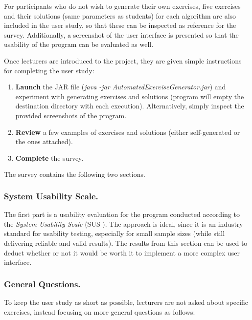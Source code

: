 \documentclass{l4proj}
\begin{document}
For participants who do not wish to generate their own exercises, five exercises and their solutions (same parameters as students) for each algorithm are also included in the user study, so that these can be inspected as reference for the survey. Additionally, a screenshot of the user interface is presented so that the usability of the program can be evaluated as well.

Once lecturers are introduced to the project, they are given simple instructions for completing the user study:
\begin{enumerate}
	\item
	\textbf{Launch} the JAR file (\emph{java -jar AutomatedExerciseGenerator.jar}) and experiment with generating exercises and solutions (program will empty the destination directory with each execution). Alternatively, simply inspect the provided screenshots of the program.
	\item
	\textbf{Review} a few examples of exercises and solutions (either self-generated or the ones attached).
	\item
	\textbf{Complete} the survey.
\end{enumerate}

The survey contains the following two sections.

\subsubsection{System Usability Scale.}

The first part is a usability evaluation for the program conducted according to the \emph{System Usability Scale} (SUS \cite{a}). The approach is ideal, since it is an industry standard for usability testing, especially for small sample sizes (while still delivering reliable and valid results). The results from this section can be used to deduct whether or not it would be worth it to implement a more complex user interface.

\subsubsection{General Questions.}

To keep the user study as short as possible, lecturers are not asked about specific exercises, instead focusing on more general questions as follows:
\end{document}

